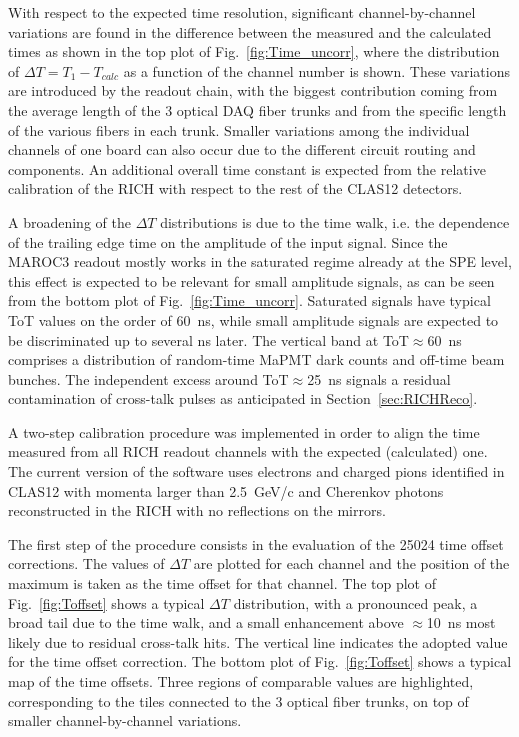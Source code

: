 \documentclass[5p,times,twocolumn]{elsarticle}
\def\MaPMT{MaPMT }
\begin{document}
With respect to the expected time resolution, significant channel-by-channel variations are found in the difference
between the measured and the calculated times as shown in the top plot of Fig.~\ref{fig:Time_uncorr}, where the
distribution of $\Delta T=T_1-T_{calc}$ as a function of the channel number is shown. These variations are introduced
by the readout chain, with the biggest contribution coming from the average length of the 3 optical DAQ fiber trunks and
from the specific length of the various fibers in each trunk. Smaller variations among the individual channels of one
board can also occur due to the different circuit routing and components. An additional overall time constant is
expected from the relative calibration of the RICH with respect to the rest of the CLAS12 detectors.

A broadening of the $\Delta T$ distributions is due to the time walk, i.e. the dependence of the trailing edge time
on the amplitude of the input signal. Since the MAROC3 readout mostly works in the saturated regime already
at the SPE level, this effect is expected to be relevant for small amplitude signals, as can be seen from the bottom
plot of Fig.~\ref{fig:Time_uncorr}. Saturated signals have typical ToT values on the order of 60~ns, while small
amplitude signals are expected to be discriminated up to several ns later. The vertical band at ToT$\approx$60~ns
comprises a distribution of random-time \MaPMT dark counts and off-time beam bunches. The independent excess
around ToT$\approx$25~ns signals a residual contamination of cross-talk pulses as anticipated in Section~\ref{sec:RICHReco}.


A two-step calibration procedure was implemented in order to align the time measured from all RICH readout
channels with the expected (calculated) one. The current version of the software uses electrons and charged pions
identified in CLAS12 with momenta larger than 2.5~GeV/c and Cherenkov photons reconstructed in the RICH with
no reflections on the mirrors.

The first step of the procedure consists in the evaluation of the 25024 time offset corrections. The values of
$\Delta T$ are plotted for each channel and the position of the maximum is taken as the time offset for that
channel. The top plot of Fig.~\ref{fig:Toffset} shows a typical $\Delta T$ distribution, with a pronounced peak, a
broad tail due to the time walk, and a small enhancement above $\approx$10~ns most likely due to residual cross-talk
hits. The vertical line indicates the adopted value for the time offset correction. The bottom plot of
Fig.~\ref{fig:Toffset} shows a typical map of the time offsets. Three regions of comparable values are highlighted,
corresponding to the tiles connected to the 3 optical fiber trunks, on top of smaller channel-by-channel variations.
\end{document}
